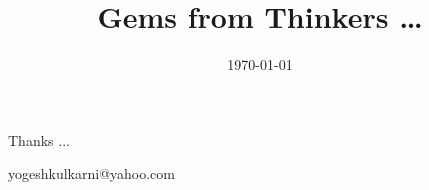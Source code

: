 \documentclass[xcolor=dvipsnames,compress,t,pdf]{beamer}
\title[\hspace{4cm} \insertframenumber /\inserttotalframenumber]
{Gems from Thinkers \ldots}
\date[2020]{\today}
\begin{document}
\begin{frame}
\titlepage
\end{frame}

\begin{frame}[c]{}
Thanks ...

\vspace{5mm}
yogeshkulkarni@yahoo.com
\end{frame}
\end{document}
